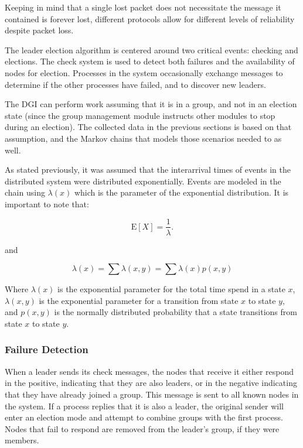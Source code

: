Keeping in mind that a single lost packet does not necessitate the message it
contained is forever lost, different protocols allow for different levels of
reliability despite packet loss.

The leader election algorithm is centered around two critical events: checking
and elections. The check system is used to detect both failures and the
availability of nodes for election. Processes in the system occasionally exchange 
messages to determine if the other processes have failed, and to discover new
leaders. 

The DGI can perform work assuming that it is in a group, and not in an election
state (since the group management module instructs other modules to stop during
an election). The collected data in the previous sections is based on that
assumption, and the Markov chains that models those scenarios needed to as
well.

As stated previously, it was assumed that the interarrival times of events in the distributed system
were distributed exponentially. Events are modeled in the chain
using $\lambda(x)$ which is the parameter of the exponential distribution. It
is important to note that:

\begin{equation}
\mathrm{E}[X] = \frac{1}{\lambda}. \!
\end{equation}

and

\begin{equation}
\lambda(x) = \sum \lambda(x,y) = \sum \lambda(x) p(x,y)
\end{equation}

Where $\lambda(x)$ is the exponential parameter for the total time spend in
a state $x$, $\lambda(x,y)$ is the exponential parameter for a transition from
state $x$ to state $y$, and $p(x,y)$ is the normally distributed probability that
a state transitions from state $x$ to state $y$.

\subsubsection{Failure Detection}
When a leader sends its check messages, the nodes that receive it either
respond in the positive, indicating that they are also leaders, or in the
negative indicating that they have already joined a group. This message is sent
to all known nodes in the system. If a process replies that it is also a
leader, the original sender will enter an election mode and attempt to combine
groups with the first process. Nodes that fail to respond are removed from the
leader's group, if they were members.

